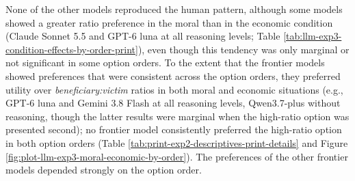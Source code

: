 \documentclass[
]{article}
\begin{document}
None of the other models reproduced the human pattern, although some models showed a greater ratio preference in the moral than in the economic condition (Claude Sonnet 5.5 and GPT-6 luna at all reasoning levels; Table \ref{tab:llm-exp3-condition-effects-by-order-print}), even though this tendency was only marginal or not significant in some option orders. To the extent that the frontier models showed preferences that were consistent across the option orders, they preferred utility over \emph{beneficiary:victim} ratios in both moral and economic situations (e.g., GPT-6 luna and Gemini 3.8 Flash at all reasoning levels, Qwen3.7-plus without reasoning, though the latter results were marginal when the high-ratio option was presented second); no frontier model consistently preferred the high-ratio option in both option orders (Table \ref{tab:print-exp2-descriptives-print-details} and Figure \ref{fig:plot-llm-exp3-moral-economic-by-order}). The preferences of the other frontier models depended strongly on the option order.
\end{document}
